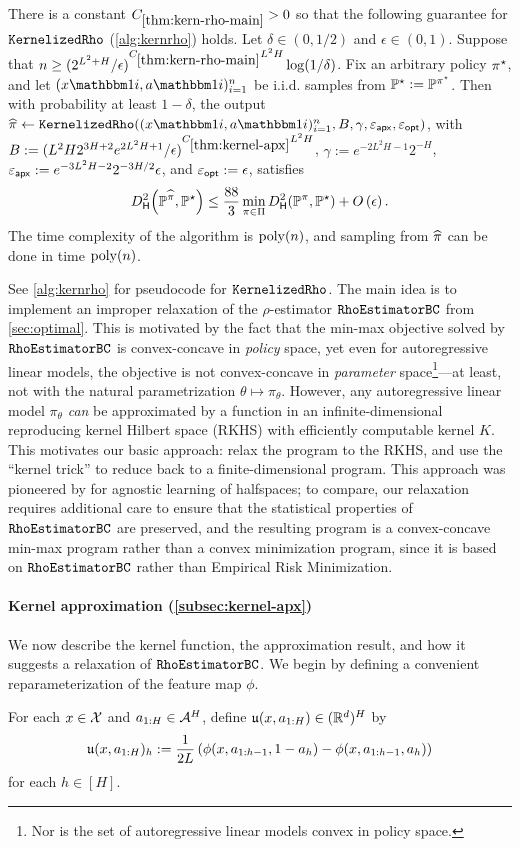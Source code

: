 

\begin{theorem}\label{thm:kern-rho-main}
There is a constant $C_{\ref{thm:kern-rho-main}}>0$ so that the following guarantee for $\texttt{KernelizedRho}$ (\cref{alg:kernrho}) holds. Let $\delta \in (0,1/2)$ and $\epsilon \in (0,1)$. Suppose that $n \geq (2^{L^2+H}/\epsilon)^{C_{\ref{thm:kern-rho-main}}L^2H} \log(1/\delta)$. Fix an arbitrary policy $\pi^{\star}$, and let $(x\ind{i},a\ind{i})_{i=1}^n$ be i.i.d. samples from $\mathbb{P}^{\star}\vcentcolon=\mathbb{P}^{\pi^{\star}}$. Then with probability at least $1-\delta$, the output $\pihat\gets \KernRho((x\ind{i},a\ind{i})_{i=1}^n, B,\gamma,\epapx,\epopt)$, with $B := (L^2H2^{3H+2}e^{2L^2 H+1}/\epsilon)^{C_{\ref{thm:kernel-apx}}L^2H}$, $\gamma := e^{-2L^2 H-1}2^{-H}$, $\varepsilon_{\mathsf{apx}} := e^{-3L^2 H-2}2^{-3H/2}\epsilon$, and $\varepsilon_{\mathsf{opt}} := \epsilon$, satisfies
\[\Dhels{\BP^{\pihat}}{\BP^\star}
\leq \frac{88}{3}\min_{\pi\in\Pi} \Dhels{\BP^{\pi}}{\BP^\star} + O\left(\epsilon\right).\]
The time complexity of the algorithm is $\mathrm{poly}(n)$, and sampling from $\widehat{\pi}$ can be done in time $\mathrm{poly}(n)$.
\end{theorem}

See \cref{alg:kernrho} for pseudocode for $\texttt{KernelizedRho}$. The main idea is to implement an improper relaxation of the $\rho$-estimator $\texttt{RhoEstimatorBC}$ from \cref{sec:optimal}. This is motivated by the fact that the min-max objective solved by $\texttt{RhoEstimatorBC}$ is convex-concave in \emph{policy} space, yet even for autoregressive linear models, the objective is not convex-concave in \emph{parameter} space\footnote{Nor is the set of autoregressive linear models convex in policy space.}---at least, not with the natural parametrization $\theta \mapsto \pi_\theta$. However, any autoregressive linear model $\pi_\theta$ \emph{can} be approximated by a function in an infinite-dimensional reproducing kernel Hilbert space (RKHS) with efficiently computable kernel $K$. This motivates our basic approach: relax the program to the RKHS, and use the ``kernel trick'' to reduce back to a finite-dimensional program. This approach was pioneered by \cite{shalev2011learning} for agnostic learning of halfspaces; to compare, our relaxation requires additional care to ensure that the statistical properties of $\texttt{RhoEstimatorBC}$ are preserved, and the resulting program is a convex-concave min-max program rather than a convex minimization program, since it is based on $\texttt{RhoEstimatorBC}$ rather than Empirical Risk Minimization.

\paragraph{Kernel approximation (\cref{subsec:kernel-apx})}
We now describe the kernel function, the approximation result, and how it suggests a relaxation of $\texttt{RhoEstimatorBC}$. We begin by defining a convenient reparameterization of the feature map $\phi$.
\begin{definition}\label{def:uvec}
For each $x \in \mathcal{X}$ and $a_{1:H} \in \mathcal{A}^H$, define $\mathfrak{u}(x,a_{1:H}) \in (\mathbb{R}^d)^H$ by
\[\mathfrak{u}(x,a_{1:H})_h := \frac{1}{2L}\left(\phi(x,a_{1:h-1},1-a_h) - \phi(x,a_{1:h-1},a_h)\right)\]
for each $h \in [H]$. %
\end{definition}

